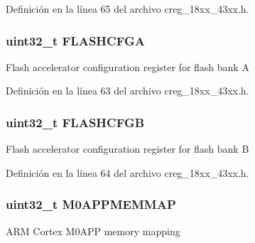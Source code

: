 Definición en la línea 65 del archivo creg\+\_\+18xx\+\_\+43xx.\+h.

\subsubsection[{\texorpdfstring{F\+L\+A\+S\+H\+C\+F\+GA}{FLASHCFGA}}]{ uint32\+\_\+t F\+L\+A\+S\+H\+C\+F\+GA}\hypertarget{struct_l_p_c___c_r_e_g___t_a4e9ae6bd308f04ba3187f2ef4c7519bd}{}\label{struct_l_p_c___c_r_e_g___t_a4e9ae6bd308f04ba3187f2ef4c7519bd}
Flash accelerator configuration register for flash bank A 

Definición en la línea 63 del archivo creg\+\_\+18xx\+\_\+43xx.\+h.

\subsubsection[{\texorpdfstring{F\+L\+A\+S\+H\+C\+F\+GB}{FLASHCFGB}}]{ uint32\+\_\+t F\+L\+A\+S\+H\+C\+F\+GB}\hypertarget{struct_l_p_c___c_r_e_g___t_a60f27aaa391b3ea2c5150cdc873d1347}{}\label{struct_l_p_c___c_r_e_g___t_a60f27aaa391b3ea2c5150cdc873d1347}
Flash accelerator configuration register for flash bank B 

Definición en la línea 64 del archivo creg\+\_\+18xx\+\_\+43xx.\+h.

\subsubsection[{\texorpdfstring{M0\+A\+P\+P\+M\+E\+M\+M\+AP}{M0APPMEMMAP}}]{ uint32\+\_\+t M0\+A\+P\+P\+M\+E\+M\+M\+AP}\hypertarget{struct_l_p_c___c_r_e_g___t_a1f40a3087681f33657e1d39dda8b3151}{}\label{struct_l_p_c___c_r_e_g___t_a1f40a3087681f33657e1d39dda8b3151}
A\+RM Cortex M0\+A\+PP memory mapping 

